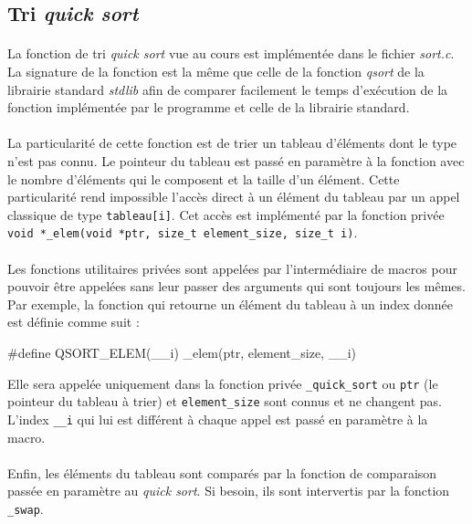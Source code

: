 \documentclass{article}
\begin{document}
    \subsection{Tri \emph{quick sort}}
    \paragraph{}
    La fonction de tri \emph{quick sort} vue au cours est implémentée dans le fichier \emph{sort.c}. La signature de la fonction est la même que celle de la fonction \emph{qsort} de la librairie standard \emph{stdlib} afin de  comparer facilement le temps d'exécution de la fonction implémentée par le programme et celle de la librairie standard.

    \paragraph{}
    La particularité de cette fonction est de trier un tableau d'éléments dont le type n'est pas connu. Le pointeur du tableau est passé en paramètre à la fonction avec le nombre d'éléments qui le composent et la taille d'un élément. Cette particularité rend impossible l'accès direct à un élément du tableau par un appel classique de type \texttt{tableau[i]}. Cet accès est implémenté par la fonction privée \texttt{void *\_elem(void *ptr, size\_t element\_size, size\_t i)}.

    \paragraph{}
    Les fonctions utilitaires privées sont appelées par l'intermédiaire de macros pour pouvoir être appelées sans leur passer des arguments qui sont toujours les mêmes. Par exemple, la fonction qui retourne un élément du tableau à un index donnée est définie comme suit :
    \begin{verbatimtab}
        #define QSORT_ELEM(__i)         _elem(ptr, element_size, __i)
    \end{verbatimtab}
    Elle sera appelée uniquement dans la fonction privée \texttt{\_quick\_sort} ou \texttt{ptr} (le pointeur du tableau à trier) et \texttt{element\_size} sont connus et ne changent pas. L'index \texttt{\_\_i} qui lui est différent à chaque appel est passé en paramètre à la macro.

    \paragraph{}
    Enfin, les éléments du tableau sont comparés par la fonction de comparaison passée en paramètre au \emph{quick sort}. Si besoin, ils sont intervertis par la fonction \texttt{\_swap}.
\end{document}
